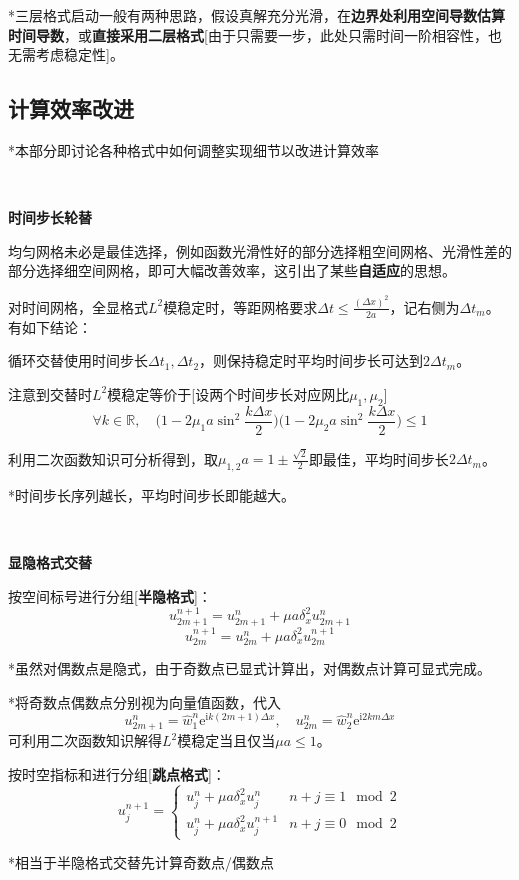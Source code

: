 \documentclass[a4paper,UTF8,fontset=windows]{ctexart}
\begin{document}
*三层格式启动一般有两种思路，假设真解充分光滑，在\textbf{边界处利用空间导数估算时间导数}，或\textbf{直接采用二层格式}[由于只需要一步，此处只需时间一阶相容性，也无需考虑稳定性]。

\subsection{计算效率改进}
*本部分即讨论各种格式中如何调整实现细节以改进计算效率

\

\textbf{时间步长轮替}

均匀网格未必是最佳选择，例如函数光滑性好的部分选择粗空间网格、光滑性差的部分选择细空间网格，即可大幅改善效率，这引出了某些\textbf{自适应}的思想。

对时间网格，全显格式$L^2$模稳定时，等距网格要求$\Delta t\le\frac{(\Delta x)^2}{2a}$，记右侧为$\Delta t_m$。有如下结论：

循环交替使用时间步长$\Delta t_1,\Delta t_2$，则保持稳定时平均时间步长可达到$2\Delta t_m$。

注意到交替时$L^2$模稳定等价于[设两个时间步长对应网比$\mu_1,\mu_2$]
$$\forall k\in\mathbb{R},\quad\bigg(1-2\mu_1a\sin^2\frac{k\Delta x}{2}\bigg)\bigg(1-2\mu_2a\sin^2\frac{k\Delta x}{2}\bigg)\le1$$

利用二次函数知识可分析得到，取$\mu_{1,2}a=1\pm\frac{\sqrt2}{2}$即最佳，平均时间步长$2\Delta t_m$。

*时间步长序列越长，平均时间步长即能越大。

\

\textbf{显隐格式交替}

按空间标号进行分组[\textbf{半隐格式}]：
$$u_{2m+1}^{n+1}=u_{2m+1}^n+\mu a\delta_x^2u_{2m+1}^n$$
$$u_{2m}^{n+1}=u_{2m}^n+\mu a\delta_x^2u_{2m}^{n+1}$$

*虽然对偶数点是隐式，由于奇数点已显式计算出，对偶数点计算可显式完成。

*将奇数点偶数点分别视为向量值函数，代入
$$u_{2m+1}^n=\hat{w}_1^n\mathrm{e}^{\mathrm{i}k(2m+1)\Delta x},\quad u_{2m}^n=\hat{w}_2^n\mathrm{e}^{\mathrm{i}2km\Delta x}$$
可利用二次函数知识解得$L^2$模稳定当且仅当$\mu a\le1$。

按时空指标和进行分组[\textbf{跳点格式}]：
$$u_j^{n+1}=\begin{cases}u_j^n+\mu a\delta_x^2u_j^n&n+j\equiv 1\mod 2\\u_j^n+\mu a\delta_x^2u_j^{n+1}&n+j\equiv 0\mod 2\end{cases}$$

*相当于半隐格式交替先计算奇数点/偶数点
\end{document}
